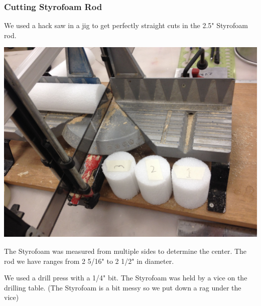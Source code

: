 \documentclass[11pt]{article} %
\begin{document}
\subsubsection{Cutting Styrofoam Rod}
We used a hack saw in a jig to get perfectly straight cuts in the 2.5" Styrofoam rod. 

\begin{center}
\includegraphics[scale=0.15]{feed/01.jpeg}
\end{center}

The Styrofoam was measured from multiple sides to determine the center. The rod we have ranges from 2 5/16" to 2 1/2" in diameter.

We used a drill press with a 1/4" bit. The Styrofoam was held by a vice on the drilling table. (The Styrofoam is a bit messy so we put down a rag under the vice) 
\end{document}
